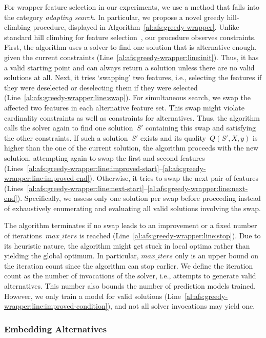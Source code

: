 \documentclass{article}
\theoremstyle{definition}
\begin{document}
For wrapper feature selection in our experiments, we use a method that falls into the category \emph{adapting search}.
In particular, we propose a novel greedy hill-climbing procedure, displayed in Algorithm~\ref{al:afs:greedy-wrapper}.
Unlike standard hill climbing for feature selection~\cite{kohavi1997wrappers}, our procedure observes constraints.
First, the algorithm uses a solver to find one solution that is alternative enough, given the current constraints (Line~\ref{al:afs:greedy-wrapper:line:init}).
Thus, it has a valid starting point and can always return a solution unless there are no valid solutions at all.
Next, it tries `swapping' two features, i.e., selecting the features if they were deselected or deselecting them if they were selected (Line~\ref{al:afs:greedy-wrapper:line:swap}).
For simultaneous search, we swap the affected two features in each alternative feature set.
This swap might violate cardinality constraints as well as constraints for alternatives.
Thus, the algorithm calls the solver again to find one solution~$S'$ containing this swap and satisfying the other constraints.
If such a solution~$S'$ exists and its quality~$Q(S',X,y)$ is higher than the one of the current solution, the algorithm proceeds with the new solution, attempting again to swap the first and second features (Lines~\ref{al:afs:greedy-wrapper:line:improved-start}--\ref{al:afs:greedy-wrapper:line:improved-end}).
Otherwise, it tries to swap the next pair of features (Lines~\ref{al:afs:greedy-wrapper:line:next-start}--\ref{al:afs:greedy-wrapper:line:next-end}).
Specifically, we assess only one solution per swap before proceeding instead of exhaustively enumerating and evaluating all valid solutions involving the swap.

The algorithm terminates if no swap leads to an improvement or a fixed number of iterations~$max\_iters$ is reached (Line~\ref{al:afs:greedy-wrapper:line:stop}).
Due to its heuristic nature, the algorithm might get stuck in local optima rather than yielding the global optimum.
In particular, $max\_iters$ only is an upper bound on the iteration count since the algorithm can stop earlier.
We define the iteration count as the number of invocations of the solver, i.e., attempts to generate valid alternatives.
This number also bounds the number of prediction models trained.
However, we only train a model for valid solutions (Line~\ref{al:afs:greedy-wrapper:line:improved-condition}), and not all solver invocations may yield one.

\subsubsection{Embedding Alternatives}
\label{sec:afs:approach:objectives:embedding}
\end{document}
